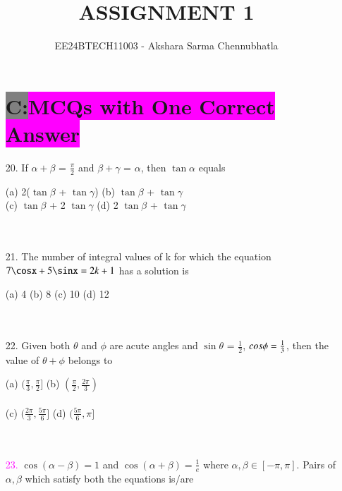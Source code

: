 \documentclass[journal,12pt,twocolumn,article]{IEEEtran}
\theoremstyle{remark}
\begin{document}
\begin{enumerate}

\vspace{3cm}
\title{ASSIGNMENT 1}
\author{EE24BTECH11003 - Akshara Sarma Chennubhatla}
\maketitle
\newpage
\bigskip
\section*{\color{black}\colorbox{gray}{\textbf{\large{C:}}}\color{white}\colorbox{magenta}{\textbf{\large{MCQs with One Correct Answer}}}}
\item[20.] If $\alpha + \beta$ = $\frac{\pi}{2}$ and $\beta + \gamma$ = $\alpha$, then $\tan \alpha$ equals
\begin{flushright}
\end{flushright}
(a) 2($\tan \beta$ + $\tan \gamma$)\quad
(b) $\tan\beta$ + $\tan\gamma$\\
(c) $\tan\beta$ + 2 $\tan\gamma$ \quad
(d) 2 $\tan\beta$ + $\tan\gamma$\\\\\\
\item[21.] The number of integral values of k for which the equation $7\cosx + 5\sinx = 2k+1$ has a solution is
\begin{flushright}
    \textcolor{magenta}{}
\end{flushright}
(a) 4 \quad 
(b) 8 \quad 
(c) 10 \quad 
(d) 12 \quad\\\\\\
\item[22.] Given both $\theta$ and $\phi$ are acute angles and $\sin\theta$ = $\frac{1}{2}$, $\\cos\phi = \frac{1}{3}$, then the value of $\theta + \phi$ belongs to\begin{flushright}
    \textcolor{magenta}{}
\end{flushright}
(a) $(\frac{\pi}{3},\frac{\pi}{2}]$ \quad
(b) $(\frac{\pi}{2},\frac{2\pi}{3})$ \\\\
(c) $(\frac{2\pi}{3},\frac{5\pi}{6}]$ \quad
(d) $(\frac{5\pi}{6},\pi]$ \\\\\\
\item[\textcolor{magenta}{23.}] $\cos(\alpha - \beta)=1$ and $\cos(\alpha + \beta)=\frac{1}{e}$ where $\alpha, \beta \in [-\pi,\pi]$. Pairs of $\alpha, \beta$ which satisfy both the equations is/are

\end{enumerate}
\end{document}
